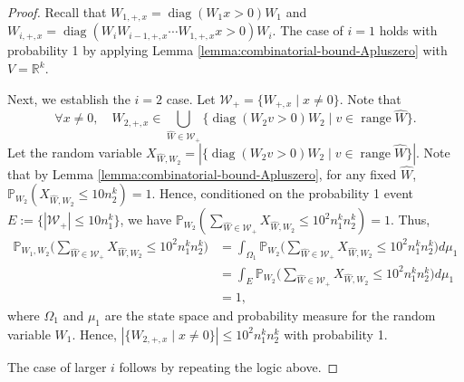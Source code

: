 \documentclass[11pt]{article}
\newcommand{\R}{\mathbb{R}}
\newcommand{\A}{\mathcal{A}}
\newcommand{\calAp}{\A_+}
\newcommand{\calWp}{\mathcal{W}_+}
\newcommand{\PP}{\mathbb{P}}
\newcommand{\Aplus}[1]{A_{+, #1}}
\newcommand{\Wplus}[1]{W_{+, #1}}
\newcommand{\Ahat}{\hat{A}}
\newcommand{\Apx}{\Aplus{x}}
\newcommand{\Wpx}{\Wplus{x}}
\newcommand{\Bpx}{B_{+, x}}
\newcommand{\XWhatWtwo}{X_{\What, W_2}}
\newcommand{\Wipxn}[1]{W_{#1, +, x}}
\newcommand{\Wipx}{W_{i, +, x}}
\newcommand{\What}{\hat{W}}
\DeclareMathOperator{\diag}{diag}
\DeclareMathOperator{\range}{range}
\begin{document}
\begin{proof}
Recall that $\Wipxn{1} = \diag(W_1 x>0) W_1$ and $\Wipx = \diag(W_i \Wipxn{i-1} \cdots \Wipxn{1} x>0) W_i$. 
The case of $i=1$ holds with probability 1 by applying Lemma \ref{lemma:combinatorial-bound-Apluszero} with $V = \R^k$. 

Next, we establish the $i=2$ case. Let $\calWp = \{ \Wpx \mid x \neq 0\}$.  Note that 
\[
\forall x \neq 0, \quad \Wipxn{2} \in \bigcup_{\What \in \calWp} \{ \diag( W_2 v>0) W_2 \mid v \in \range \What \}.
\]
Let the random variable $\XWhatWtwo = | \{ \diag(W_2 v>0)W_2 \mid v \in \range \What \} |$.  Note that by Lemma \ref{lemma:combinatorial-bound-Apluszero}, for any fixed $\What$, $\PP_{W_2}(\XWhatWtwo \leq  10 n_2^k) = 1$.  Hence, conditioned on the probability 1 event $E:=\{|\calWp|\leq 10 n_1^k\}$, we have  $\PP_{W_2}(\sum_{\What \in \calWp} \XWhatWtwo \leq 10^2 n_1^k n_2^k) = 1$. 
Thus, %
\begin{align*}
\PP_{W_1,W_2} \Biggl( \sum_{\What \in \calWp} \XWhatWtwo \leq 10^2 n_1^k n_2^k \Biggr) 
& = \int_{\Omega_{1}} \PP_{W_2}\Biggl( \sum_{\What \in \calWp} \XWhatWtwo \leq 10^2 n_1^k n_2^k \Biggr) d\mu_{1}\\
& = \int_{E} \PP_{W_2}\Biggl( \sum_{\What \in \calWp} \XWhatWtwo \leq 10^2 n_1^k n_2^k \Biggr) d\mu_{1} \\
 &= 1,
\end{align*}
where $\Omega_{1}$ and $\mu_{1}$ are the state space and probability measure for the random variable $W_1$.  Hence, $|\{\Wipxn{2} \mid x \neq 0\}| \leq 10^2 n_1^k n_2^k$ with probability 1.

The case of larger $i$ follows by repeating the logic above.


\end{proof}
\end{document}
